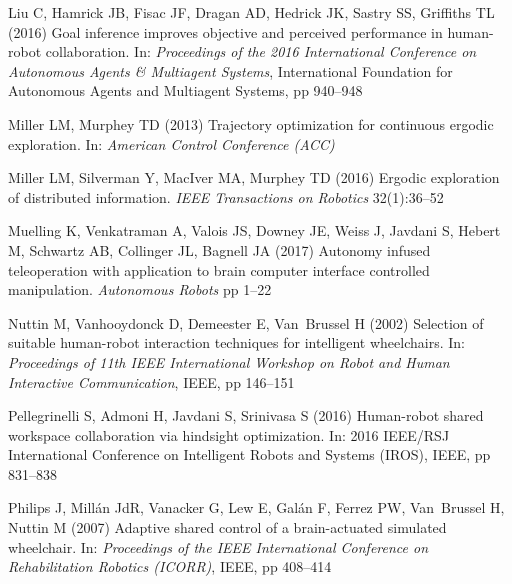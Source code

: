 \documentclass[natbib, twocolumn]{svjour3}          %
\begin{document}
\begin{thebibliography}{54}
	Liu C, Hamrick JB, Fisac JF, Dragan AD, Hedrick JK, Sastry SS, Griffiths TL
	(2016) Goal inference improves objective and perceived performance in
	human-robot collaboration. In: \textit{Proceedings of the 2016 International
		Conference on Autonomous Agents \& Multiagent Systems}, International
	Foundation for Autonomous Agents and Multiagent Systems, pp 940--948
	
	Miller LM, Murphey TD (2013) Trajectory optimization for continuous ergodic
	exploration. In: \textit{American Control Conference (ACC)}
	
	Miller LM, Silverman Y, MacIver MA, Murphey TD (2016) Ergodic exploration of
	distributed information. \textit{IEEE Transactions on Robotics} 32(1):36--52
	
	Muelling K, Venkatraman A, Valois JS, Downey JE, Weiss J, Javdani S, Hebert M,
	Schwartz AB, Collinger JL, Bagnell JA (2017) Autonomy infused teleoperation
	with application to brain computer interface controlled manipulation.
	\textit{Autonomous Robots} pp 1--22
	
	Nuttin M, Vanhooydonck D, Demeester E, Van~Brussel H (2002) Selection of
	suitable human-robot interaction techniques for intelligent wheelchairs. In:
	\textit{Proceedings of 11th IEEE International Workshop on Robot and Human
		Interactive Communication}, IEEE, pp 146--151
	
	Pellegrinelli S, Admoni H, Javdani S, Srinivasa S (2016) Human-robot shared
	workspace collaboration via hindsight optimization. In: 2016 IEEE/RSJ International Conference on Intelligent Robots
	and Systems (IROS), IEEE, pp
	831--838
	
	Philips J, Mill{\'a}n JdR, Vanacker G, Lew E, Gal{\'a}n F, Ferrez PW,
	Van~Brussel H, Nuttin M (2007) Adaptive shared control of a brain-actuated
	simulated wheelchair. In: \textit{Proceedings of the IEEE International
		Conference on Rehabilitation Robotics (ICORR)}, IEEE, pp 408--414
	

\end{thebibliography}
\end{document}
